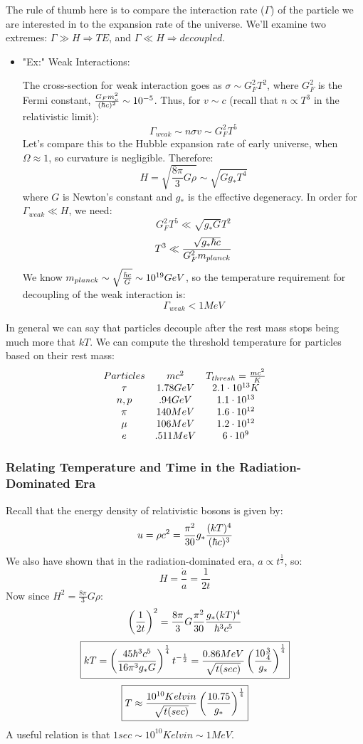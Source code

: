 \documentclass{article}
\def\hf{\frac12}
\def\imply{\Rightarrow}
\def\inv#1{\frac{1}{ #1}}
\def\aa{\frac{\dot a }{ a}}
\def\epot{\frac{8\pi}{ 3}}
\def\hf{\frac12}
\def\imply{\Rightarrow}
\begin{document}
The rule of thumb here is to compare the interaction rate ($\Gamma$)
of the particle we are interested in to the expansion rate of the universe.  
We'll examine two extremes: $\Gamma\gg H\imply TE$, and $\Gamma\ll H\imply 
decoupled$.
\begin{itemize}
\item"Ex:" Weak Interactions:\par
The cross-section for weak interaction goes as $\sigma\sim G_F^2T^2$, where
$G_F^2$ is the Fermi constant, ${G_Fm_o^2\over(\hbar c)^2}\sim 10^{-5}$.  Thus,
for $v\sim c$ (recall that $n\propto T^3$ in the relativistic limit):
$$\Gamma_{weak}\sim n\sigma v\sim G_F^2T^5$$
Let's compare this to the Hubble expansion rate of early universe, when 
$\Omega\approx 1$, so curvature is negligible.  Therefore:
$$H=\sqrt{\epot G\rho}\sim\sqrt{Gg_*T^4}$$
where $G$ is Newton's constant and $g_*$ is the effective degeneracy.  In 
order for $\Gamma_{weak}\ll H$, we need:
$$G_F^2T^5\ll\sqrt{g_*G}T^2$$
$$T^3\ll {\sqrt{g_*\hbar c}\over G_F^2m_{planck}}$$
We know $m_{planck}\sim\sqrt{\hbar c\over G}\sim 10^{19}GeV$, so the 
temperature requirement for decoupling of the weak interaction is:
$$\Gamma_{weak}<1 MeV$$
\end{itemize}
In general we can say that particles decouple after the rest mass stops
being much more that $kT$.  We can compute the threshold temperature for
particles based on their rest mass:
$$\begin{matrix} Particles&mc^2&T_{thresh}={mc^2\over K}\\
\tau&1.78GeV&2.1\cdot10^{13} K\\
n,p&.94GeV&1.1\cdot10^{13}\\
\pi&140MeV&1.6\cdot10^{12}\\
\mu&106MeV&1.2\cdot10^{12}\\
e&.511MeV&6\cdot10^9\\\end{matrix}$$

\subsubsection*{ Relating Temperature and Time in the Radiation-Dominated Era}

Recall that the energy density of relativistic bosons is given by:
$$u=\rho c^2={\pi^2\over 30}g_*{(kT)^4\over(\hbar c)^3}$$
We also have shown that in the radiation-dominated era, $a\propto t^\hf$, so:
$$H=\aa=\inv{2t}$$
Now since $H^2=\epot G\rho$:
\def\psot{{\pi^2\over 30}}
$$\left(\inv{2t}\right)^2=\epot G\psot{g_*(kT)^4\over\hbar^3c^5}$$
$$\boxed{kT=\left({45\hbar^3c^5\over16\pi^3g_*G}\right)^{1\over4}t^{-\hf}
={0.86MeV\over\sqrt{t(sec)}}\left({10{3\over4}\over g_*}\right)^{1\over4}}$$
$$\boxed{T\approx{10^{10}Kelvin\over\sqrt{t(sec)}}\left({10.75\over 
g_*}\right)^{1\over4}}$$
A useful relation is that $1sec\sim 10^{10}Kelvin\sim 1MeV$.
\end{document}
